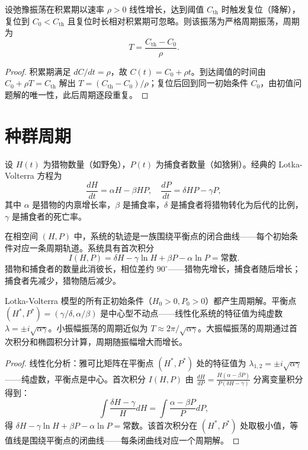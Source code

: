 \begin{lemma}[锯齿形弛豫振荡的周期]\label{ch25_sawtooth_period}
设弛豫振荡在积累期以速率 $\rho > 0$ 线性增长，达到阈值 $C_{\text{th}}$ 时触发复位（降解），复位到 $C_0 < C_{\text{th}}$ 且复位时长相对积累期可忽略。则该振荡为严格周期振荡，周期为
\[
T = \frac{C_{\text{th}} - C_0}{\rho}.
\]
\end{lemma}

\begin{proof}
积累期满足 $dC/dt = \rho$，故 $C(t) = C_0 + \rho t$。到达阈值的时间由 $C_0 + \rho T = C_{\text{th}}$ 解出 $T = (C_{\text{th}} - C_0)/\rho$；复位后回到同一初始条件 $C_0$，由初值问题解的唯一性，此后周期逐段重复。
\end{proof}

\section{种群周期}

\begin{definition}\label{def:lotka_volterra}
设 $H(t)$ 为猎物数量（如野兔），$P(t)$ 为捕食者数量（如猞猁）。经典的 Lotka-Volterra 方程为
\[
\frac{dH}{dt} = \alpha H - \beta H P, \quad \frac{dP}{dt} = \delta H P - \gamma P,
\]
其中 $\alpha$ 是猎物的内禀增长率，$\beta$ 是捕食率，$\delta$ 是捕食者将猎物转化为后代的比例，$\gamma$ 是捕食者的死亡率。

在相空间 $(H, P)$ 中，系统的轨迹是一族围绕平衡点的闭合曲线——每个初始条件对应一条周期轨道。系统具有首次积分
\[
I(H, P) = \delta H - \gamma \ln H + \beta P - \alpha \ln P = \text{常数}.
\]
猎物和捕食者的数量此消彼长，相位差约 $90^\circ$——猎物先增长，捕食者随后增长；捕食者先减少，猎物随后减少。
\end{definition}

\begin{theorem}\label{thm:lotka_volterra_periodic}
Lotka-Volterra 模型的所有正初始条件（$H_0 > 0, P_0 > 0$）都产生周期解。平衡点 $(H^*, P^*) = (\gamma/\delta, \alpha/\beta)$ 是中心型不动点——线性化系统的特征值为纯虚数 $\lambda = \pm i\sqrt{\alpha\gamma}$。小振幅振荡的周期近似为 $T \approx 2\pi/\sqrt{\alpha\gamma}$。大振幅振荡的周期通过首次积分和椭圆积分计算，周期随振幅增大而增长。
\end{theorem}

\begin{proof}
线性化分析：雅可比矩阵在平衡点 $(H^*, P^*)$ 处的特征值为 $\lambda_{1,2} = \pm i\sqrt{\alpha\gamma}$——纯虚数，平衡点是中心。首次积分 $I(H, P)$ 由 $\frac{dH}{dP} = \frac{H(\alpha - \beta P)}{P(\delta H - \gamma)}$ 分离变量积分得到：
\[
\int \frac{\delta H - \gamma}{H} dH = \int \frac{\alpha - \beta P}{P} dP,
\]
得 $\delta H - \gamma \ln H + \beta P - \alpha \ln P = \text{常数}$。该首次积分在 $(H^*, P^*)$ 处取极小值，等值线是围绕平衡点的闭曲线——每条闭曲线对应一个周期解。
\end{proof}

